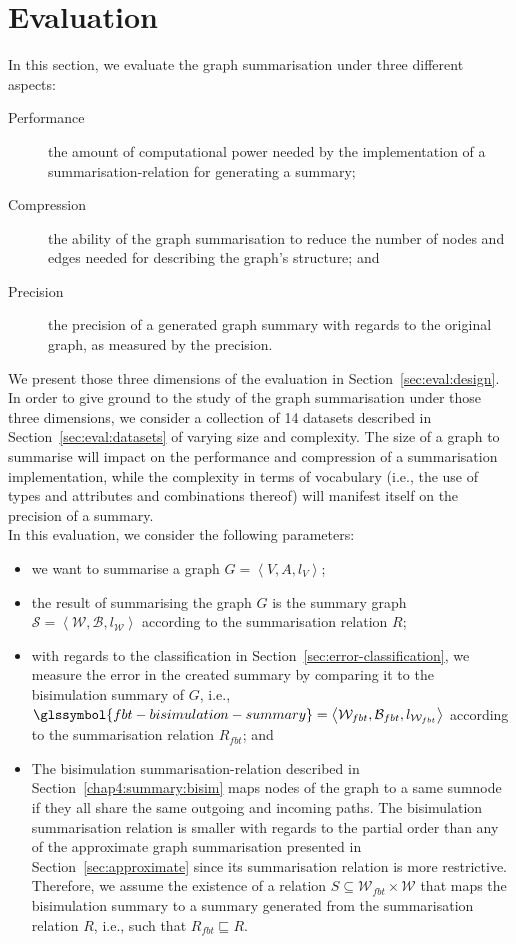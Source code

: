 \section{Evaluation}
\label{sec:eval}

In this section, we evaluate the graph summarisation under three different aspects:
\begin{description}
	\item[Performance] the amount of computational power needed by the implementation of a \gls{summarisation-relation} for generating a summary;
	\item[Compression] the ability of the graph summarisation to reduce the number of nodes and edges needed for describing the graph's structure; and
	\item[Precision] the precision of a generated graph summary with regards to the original graph, as measured by the \gls{precision}.
\end{description}
We present those three dimensions of the evaluation in Section~\ref{sec:eval:design}.
In order to give ground to the study of the graph summarisation under those three dimensions, we consider a collection of 14 datasets described in Section~\ref{sec:eval:datasets} of varying size and complexity. The size of a graph to summarise will impact on the performance and compression of a summarisation implementation, while the complexity in terms of vocabulary (i.e., the use of \gls{types} and \gls{attributes} and combinations thereof) will manifest itself on the precision of a summary.\\

In this evaluation, we consider the following parameters:
\begin{itemize}
	\item we want to summarise a graph $G=\left\langle V, A, l_V \right\rangle$;
	\item the result of summarising the graph $G$ is the summary graph $\mathcal{S} = \left\langle \mathcal{W}, \mathcal{B}, l_{\mathcal{W}} \right\rangle$ according to the summarisation relation $R$;
	\item with regards to the classification in Section~\ref{sec:error-classification}, we measure the error in the created summary by comparing it to the bisimulation summary  of $G$, i.e., $\glssymbol{fbt-bisimulation-summary} = \left\langle \mathcal{W}_{fbt}, \mathcal{B}_{fbt}, l_{\mathcal{W}_{fbt}} \right\rangle$ according to the summarisation relation $R_{fbt}$; and
	\item The bisimulation \gls{summarisation-relation} described in Section~\ref{chap4:summary:bisim} maps nodes of the graph to a same sumnode if they all share the same outgoing and incoming paths. The bisimulation summarisation relation is smaller with regards to the partial order  than any of the approximate graph summarisation presented in Section~\ref{sec:approximate} since its summarisation relation is more restrictive. Therefore, we assume the existence of a relation $S \subseteq \mathcal{W}_{fbt} \times \mathcal{W}$ that maps the bisimulation summary to a summary generated from the summarisation relation $R$, i.e., such that $R_{fbt} \sqsubseteq R$.
\end{itemize}

